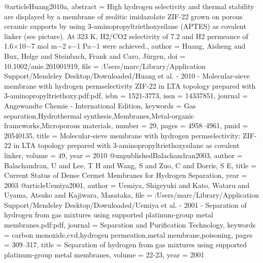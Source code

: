 @article{Huang2010a,
abstract = {High hydrogen selectivity and thermal stability are displayed by a membrane of zeolitic imidazolate ZIF-22 grown on porous ceramic supports by using 3-aminopropyltriethoxysilane (APTES) as covalent linker (see picture). At 323 K, H2/CO2 selectivity of 7.2 and H2 permeance of 1.6×10−7 mol m−2 s−1 Pa−1 were achieved.},
author = {Huang, Aisheng and Bux, Helge and Steinbach, Frank and Caro, J{\"{u}}rgen},
doi = {10.1002/anie.201001919},
file = {:Users/marc/Library/Application Support/Mendeley Desktop/Downloaded/Huang et al. - 2010 - Molecular-sieve membrane with hydrogen permselectivity ZIF-22 in LTA topology prepared with 3-aminopropyltriethoxy.pdf:pdf},
isbn = {1521-3773},
issn = {14337851},
journal = {Angewandte Chemie - International Edition},
keywords = {Gas separation,Hydrothermal synthesis,Membranes,Metal-organic frameworks,Microporous materials},
number = {29},
pages = {4958--4961},
pmid = {20540135},
title = {{Molecular-sieve membrane with hydrogen permselectivity: ZIF-22 in LTA topology prepared with 3-aminopropyltriethoxysilane as covalent linker}},
volume = {49},
year = {2010}
}
@unpublished{Balachandran2003,
author = {Balachandran, U and Lee, T H and Wang, S and Zuo, C and Dorris, S E},
title = {{Current Status of Dense Cermet Membranes for Hydrogen Separation}},
year = {2003}
}
@article{Uemiya2001,
author = {Uemiya, Shigeyuki and Kato, Wataru and Uyama, Atsuko and Kajiwara, Masataka},
file = {:Users/marc/Library/Application Support/Mendeley Desktop/Downloaded/Uemiya et al. - 2001 - Separation of hydrogen from gas mixtures using supported platinum-group metal membranes.pdf:pdf},
journal = {Separation and Purification Technology},
keywords = {carbon monoxide,cvd,hydrogen permeation,metal membrane,poisoning},
pages = {309--317},
title = {{Separation of hydrogen from gas mixtures using supported platinum-group metal membranes}},
volume = {22-23},
year = {2001}
}
